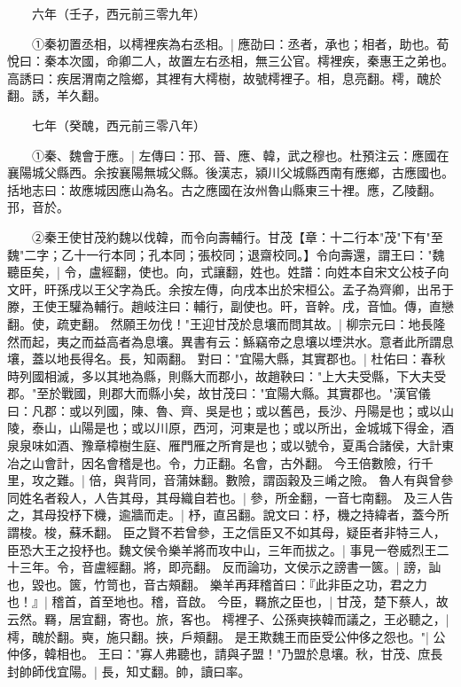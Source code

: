 　　六年（壬子，西元前三零九年）

　　①秦初置丞相，以樗裡疾為右丞相。|{
	應劭曰：丞者，承也；相者，助也。荀悅曰：秦本次國，命卿二人，故置左右丞相，無三公官。樗裡疾，秦惠王之弟也。高誘曰：疾居渭南之陰鄉，其裡有大樗樹，故號樗裡子。相，息亮翻。樗，醜於翻。誘，羊久翻。
	}

　　七年（癸醜，西元前三零八年）

　　①秦、魏會于應。|{
	左傳曰：邘、晉、應、韓，武之穆也。杜預注云：應國在襄陽城父縣西。余按襄陽無城父縣。後漢志，潁川父城縣西南有應鄉，古應國也。括地志曰：故應城因應山為名。古之應國在汝州魯山縣東三十裡。應，乙陵翻。邘，音於。
	}

　　②秦王使甘茂約魏以伐韓，而令向壽輔行。甘茂【章：十二行本"茂"下有"至魏"二字；乙十一行本同；孔本同；張校同；退齋校同。】令向壽還，謂王曰："魏聽臣矣，|{
	令，盧經翻，使也。向，式讓翻，姓也。姓譜：向姓本自宋文公枝子向文旰，旰孫戌以王父字為氏。余按左傳，向戌本出於宋桓公。孟子為齊卿，出吊于滕，王使王驩為輔行。趙岐注曰：輔行，副使也。旰，音幹。戌，音恤。傳，直戀翻。使，疏吏翻。
	}
然願王勿伐！"王迎甘茂於息壤而問其故。|{
	柳宗元曰：地長隆然而起，夷之而益高者為息壤。異書有云：鯀竊帝之息壤以堙洪水。意者此所謂息壤，蓋以地長得名。長，知兩翻。
	}
對曰："宜陽大縣，其實郡也。|{
	杜佑曰：春秋時列國相滅，多以其地為縣，則縣大而郡小，故趙鞅曰："上大夫受縣，下大夫受郡。"至於戰國，則郡大而縣小矣，故甘茂曰："宜陽大縣。其實郡也。"漢官儀曰：凡郡：或以列國，陳、魯、齊、吳是也；或以舊邑，長沙、丹陽是也；或以山陵，泰山，山陽是也；或以川原，西河，河東是也；或以所出，金城城下得金，酒泉泉味如酒、豫章樟樹生庭、雁門雁之所育是也；或以號令，夏禹合諸侯，大計東冶之山會計，因名會稽是也。令，力正翻。名會，古外翻。
	}
今王倍數險，行千里，攻之難。|{
	倍，與背同，音蒲妹翻。數險，謂函穀及三崤之險。
	}
魯人有與曾參同姓名者殺人，人告其母，其母織自若也。|{
	參，所金翻，一音七南翻。
	}
及三人告之，其母投杼下機，逾牆而走。|{
	杼，直呂翻。說文曰：杼，機之持緯者，蓋今所謂梭。梭，蘇禾翻。
	}
臣之賢不若曾參，王之信臣又不如其母，疑臣者非特三人，臣恐大王之投杼也。魏文侯令樂羊將而攻中山，三年而拔之。|{
	事見一卷威烈王二十三年。令，音盧經翻。將，即亮翻。
	}
反而論功，文侯示之謗書一篋。|{
	謗，訕也，毀也。篋，竹笥也，音古頰翻。
	}
樂羊再拜稽首曰：『此非臣之功，君之力也！』|{
	稽首，首至地也。稽，音啟。
	}
今臣，羇旅之臣也，|{
	甘茂，楚下蔡人，故云然。羇，居宜翻，寄也。旅，客也。
	}
樗裡子、公孫奭挾韓而議之，王必聽之，|{
	樗，醜於翻。奭，施只翻。挾，戶頰翻。
	}
是王欺魏王而臣受公仲侈之怨也。"|{
	公仲侈，韓相也。
	}
王曰："寡人弗聽也，請與子盟！"乃盟於息壤。秋，甘茂、庶長封帥師伐宜陽。|{
	長，知丈翻。帥，讀曰率。
	}


